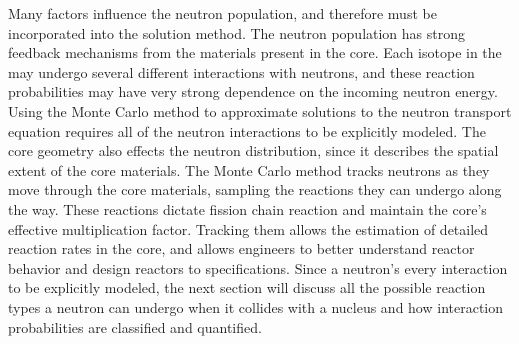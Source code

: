 
Many factors influence the neutron population, and therefore must be incorporated into the solution method.  The neutron population has strong feedback mechanisms from the materials present in the core.  Each isotope in the may undergo several different interactions with neutrons, and these reaction probabilities may have very strong dependence on the incoming neutron energy.  Using the Monte Carlo method to approximate solutions to the neutron transport equation requires all of the neutron interactions to be explicitly modeled.  The core geometry also effects the neutron distribution, since it describes the spatial extent of the core materials.   The Monte Carlo method tracks neutrons as they move through the core materials, sampling the reactions they can undergo along the way.   These reactions dictate fission chain reaction and maintain the core's effective multiplication factor.  Tracking them allows the estimation of detailed reaction rates in the core, and allows engineers to better understand reactor behavior and design reactors to specifications.  Since a neutron's every interaction to be explicitly modeled, the next section will discuss all the possible reaction types a neutron can undergo when it collides with a nucleus and how interaction probabilities are classified and quantified.





